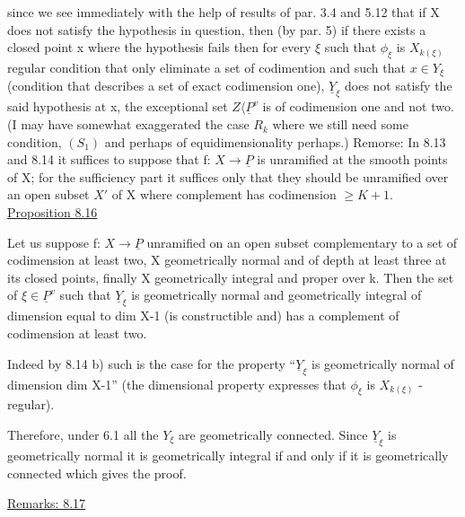 \documentclass[11pt]{article}
\newcommand{\scanpage}[1]{\par\bigskip\noindent{\small\sffamily[scan #1]}\par}
\newcommand{\mspage}[1]{{\small\sffamily[p.\,#1]}}
\newcommand{\uline}[1]{\underline{#1}}
\begin{document}
since we see immediately with the help of results of par. 3.4 and
5.12 that if X does not satisfy the hypothesis in question, then
(by par. 5) if there exists a closed point x where the hypothesis
fails then for every $\xi$ such that $\phi_{\xi}$ is $X_{k(\xi)}$ regular condition that
only eliminate a set of codimention and such that $x \in Y_{\xi}$ (condition
that describes a set of exact codimension one), $\underline{Y}_{\xi}$ does not satisfy
the said hypothesis at x, the exceptional set $Z \langle \underline{P}^{v}$ is of
codimension one and not two.  (I may have somewhat exaggerated the
case $R_{k}$ where we still need some condition, $(S_{1})$ and perhaps of
equidimensionality perhaps.)
Remorse: In 8.13 and 8.14 it suffices to suppose that f: $X \rightarrow \underline{P}$ is
unramified at the smooth points of X; for the sufficiency part it
suffices only that they should be unramified over an open subset $X'$
of X where complement has codimension $\geq K + 1$.
\uline{Proposition 8.16}

Let us suppose f: $X \rightarrow \underline{P}$ unramified on an open subset
complementary to a set of codimension at least two, X
geometrically normal and of depth at least three at its closed
points, finally X geometrically integral and proper over k.  Then
the set of $\xi \in \underline{P}^{v}$ such that $\underline{Y}_{\xi}$ is geometrically normal and
geometrically integral of dimension equal to dim X-1 (is
constructible and) has a complement of codimension at least two.

Indeed by 8.14 b) such is the case for the property ``$\underline{Y}_{\xi}$ is
geometrically normal of dimension dim X-1'' (the dimensional
property expresses that $\phi_{\xi}$ is $X_{k(\xi)}$ - regular).

\clearpage
\scanpage{24/57}
\mspage{57}

Therefore, under 6.1 all the $Y_\xi$ are geometrically connected.
Since $\underline{Y}_\xi$ is geometrically normal it is geometrically integral if
and only if it is geometrically connected which gives the proof.

\uline{Remarks: 8.17}
\end{document}
